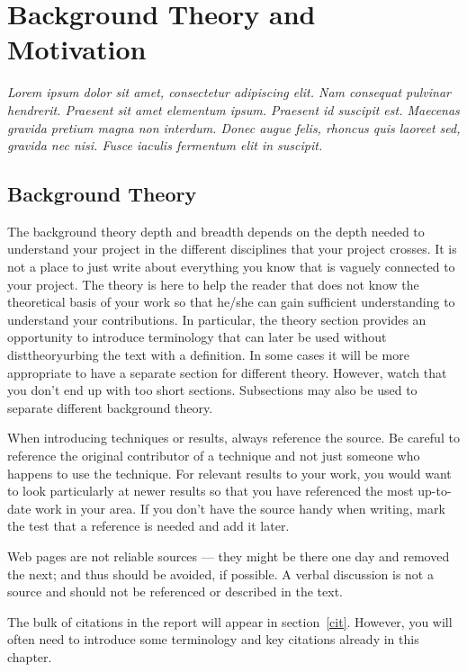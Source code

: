 \chapter{Background Theory and Motivation}\label{T-B}
\label{cha:TheoryAndBackground}

{\it Lorem ipsum dolor sit amet, consectetur adipiscing elit. Nam consequat pulvinar hendrerit. Praesent sit amet elementum ipsum. Praesent id suscipit est. Maecenas gravida pretium magna non interdum. Donec augue felis, rhoncus quis laoreet sed, gravida nec nisi. Fusce iaculis fermentum elit in suscipit.}


\section{Background Theory}
\label{sec:no1}

The background theory depth and breadth depends on the depth needed to understand your project in the different disciplines that your project crosses.  It is not a place to just write about everything you know that is vaguely connected to your project. The theory is here to help the reader that does not know the theoretical basis of your work so that he/she can gain sufficient understanding to understand your contributions. In particular, the theory section provides an opportunity to introduce terminology that can later be used without disttheoryurbing the text with a definition.  In some cases it will be more appropriate to have a separate section for different theory. However, watch that you don't end up with too short sections. Subsections may also be used to separate different background theory. 

When introducing techniques or results, always reference the source. Be careful to reference the original contributor of a technique and not just someone who happens to use the technique. For relevant results to your work, you would want to look particularly at newer results so that you have referenced the most up-to-date work in your area. If you don't have the source handy when writing, mark the test that a reference is needed and add it later. 

Web pages are not reliable sources --- they might be there one day and removed the next; and thus should be avoided, if possible. A verbal discussion is not a source and should not be referenced or described in the text.  

The bulk of citations in the report will appear in section~\ref{cit}. However, you will often need to introduce some terminology and key citations already in this chapter. 

